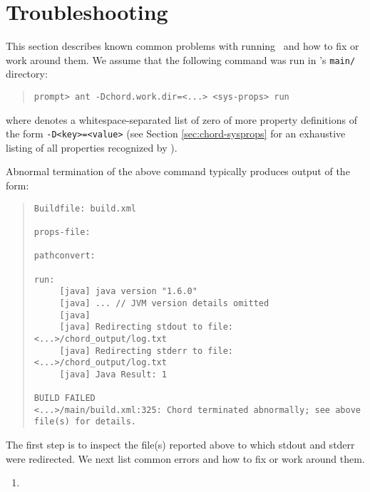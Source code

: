 \section{Troubleshooting}
\label{sec:troubleshooting}

This section describes known common problems with running \Chord\ and how to fix or work around them.
We assume that the following command was run in \Chord's {\tt main/} directory:

\begin{quote}
\begin{verbatim}
prompt> ant -Dchord.work.dir=<...> <sys-props> run
\end{verbatim}
\end{quote}

where {\tt <sys-props>} denotes a whitespace-separated list of zero of more property definitions
of the form {\tt -D<key>=<value>} (see Section \ref{sec:chord-sysprops} for an exhaustive listing of all
properties recognized by \Chord).

Abnormal termination of the above command typically produces output of the form:

\begin{quote}
\begin{verbatim}
Buildfile: build.xml

props-file:

pathconvert:

run:
     [java] java version "1.6.0"
     [java] ... // JVM version details omitted
     [java] 
     [java] Redirecting stdout to file: <...>/chord_output/log.txt
     [java] Redirecting stderr to file: <...>/chord_output/log.txt
     [java] Java Result: 1

BUILD FAILED
<...>/main/build.xml:325: Chord terminated abnormally; see above file(s) for details.
\end{verbatim}
\end{quote}

The first step is to inspect the file(s) reported above to which stdout and stderr were redirected.
We next list common errors and how to fix or work around them.

\begin{enumerate}
\item
\end{enumerate}

